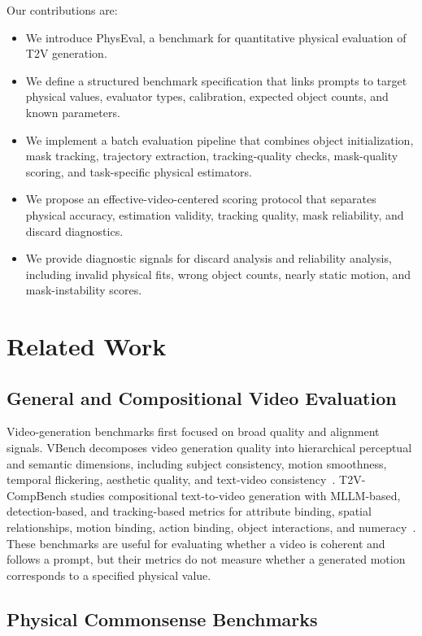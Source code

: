 \documentclass{article}
\newcommand{\bench}{PhysEval}
\begin{document}
Our contributions are:
\begin{itemize}[leftmargin=1.3em]
    \item We introduce \bench, a benchmark for quantitative physical evaluation of T2V generation.
    \item We define a structured benchmark specification that links prompts to target physical values, evaluator types, calibration, expected object counts, and known parameters.
    \item We implement a batch evaluation pipeline that combines object initialization, mask tracking, trajectory extraction, tracking-quality checks, mask-quality scoring, and task-specific physical estimators.
    \item We propose an effective-video-centered scoring protocol that separates physical accuracy, estimation validity, tracking quality, mask reliability, and discard diagnostics.
    \item We provide diagnostic signals for discard analysis and reliability analysis, including invalid physical fits, wrong object counts, nearly static motion, and mask-instability scores.
\end{itemize}

\section{Related Work}

\subsection{General and Compositional Video Evaluation}

Video-generation benchmarks first focused on broad quality and alignment signals.
VBench decomposes video generation quality into hierarchical perceptual and semantic dimensions, including subject consistency, motion smoothness, temporal flickering, aesthetic quality, and text-video consistency~\citep{huang2023vbench}.
T2V-CompBench studies compositional text-to-video generation with MLLM-based, detection-based, and tracking-based metrics for attribute binding, spatial relationships, motion binding, action binding, object interactions, and numeracy~\citep{sun2025t2vcompbench}.
These benchmarks are useful for evaluating whether a video is coherent and follows a prompt, but their metrics do not measure whether a generated motion corresponds to a specified physical value.

\subsection{Physical Commonsense Benchmarks}
\end{document}
